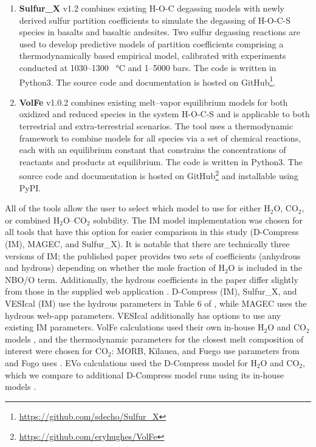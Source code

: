 \documentclass[draft, english]{volcanica-template}
\begin{document}
\begin{enumerate}
    \item \textbf{Sulfur\_X} v1.2 \parencite{Ding2023} combines existing H-O-C degassing models with newly derived sulfur partition coefficients to simulate the degassing of H-O-C-S species in basalts and basaltic andesites. Two sulfur degassing reactions are used to develop predictive models of partition coefficients comprising a thermodynamically based empirical model, calibrated with experiments conducted at 1030–1300 \SI{}{\celsius} and 1–5000 bars. The code is written in Python3. The source code and documentation is hosted on GitHub\footnote{\url{https://github.com/sdecho/Sulfur_X}}.
    \item \textbf{VolFe} v1.0.2 \parencite{hughes2024, Hughes2025volfe} combines existing melt–vapor equilibrium models for both oxidized and reduced species in the system H-O-C-S and is applicable to both terrestrial and extra-terrestrial scenarios. The tool uses a thermodynamic framework to combine models for all species via a set of chemical reactions, each with an equilibrium constant that constrains the concentrations of reactants and products at equilibrium. The code is written in Python3. The source code and documentation is hosted on GitHub\footnote{\url{https://github.com/eryhughes/VolFe}} and installable using PyPI.
\end{enumerate}

 All of the tools allow the user to select which model to use for either H$_2$O, CO$_2$, or combined H$_2$O–CO$_2$ solubility. The IM \parencite{IaconoMarziano2012} model implementation was chosen for all tools that have this option for easier comparison in this study (D-Compress (IM), MAGEC, and Sulfur\_X). It is notable that there are technically three versions of IM; the published paper provides two sets of coefficients (anhydrous and hydrous) depending on whether the mole fraction of H$_2$O is included in the NBO/O term. Additionally, the hydrous coefficients in the paper differ slightly from those in the supplied web application \parencite[see][]{Iacovino2021, WieserVESIcal2022}. D-Compress (IM), Sulfur\_X, and VESIcal (IM) use the hydrous parameters in Table 6 of \textcite{IaconoMarziano2012}, while MAGEC uses the hydrous web-app parameters. VESIcal additionally has options to use any existing IM parameters. VolFe calculations used their own in-house H$_2$O and CO$_2$ models \parencite{hughes2024}, and the thermodynamic parameters for the closest melt composition of interest were chosen for CO$_2$: MORB, Kīlauea, and Fuego use parameters from \textcite{dixon1995} and Fogo uses \textcite{thibault1994solubility}. EVo calculations used the D-Compress model for H$_2$O and CO$_2$, which we compare to additional D-Compress model runs using its in-house models \parencite{Burgisser2015}.
\end{document}
